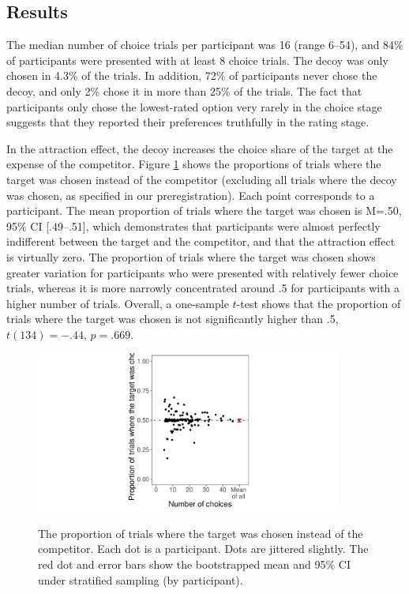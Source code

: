 \documentclass[12pt, a4paper]{article}
\begin{document}
\subsection*{Results}

The median number of choice trials per participant was 16 (range 6--54), and 84\% of participants were presented with at least 8 choice trials. The decoy was only chosen in 4.3\% of the trials. In addition, 72\% of participants never chose the decoy, and only 2\% chose it in more than 25\% of the trials. The fact that participants only chose the lowest-rated option very rarely in the choice stage suggests that they reported their preferences truthfully in the rating stage. 

In the attraction effect, the decoy increases the choice share of the target at the expense of the competitor. Figure \ref{fig:exp2_res} shows the proportions of trials where the target was chosen instead of the competitor (excluding all trials where the decoy was chosen, as specified in our preregistration). Each point corresponds to a participant. The mean proportion of trials where the target was chosen is M=.50, 95\% CI [.49--.51], which demonstrates that participants were almost perfectly indifferent between the target and the competitor, and that the attraction effect is virtually zero. The proportion of trials where the target was chosen shows greater variation for participants who were presented with relatively fewer choice trials, whereas it is more narrowly concentrated around .5 for participants with a higher number of trials. Overall, a one-sample $t$-test shows that the proportion of trials where the target was chosen is not significantly higher than .5, $t(134)=-.44$, $p=.669$. 

\begin{figure}[htb!]
\centering
		\caption{The proportion of trials where the target was chosen instead of the competitor. Each dot is a participant. Dots are jittered slightly. The red dot and error bars show the bootstrapped mean and 95\% CI under stratified sampling (by participant).}
\includegraphics[width=0.9\textwidth]{figure4.pdf}
\label{fig:exp2_res}
\end{figure}
\end{document}
